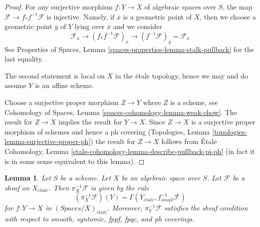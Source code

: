 \documentclass{stacks-project}
\theoremstyle{plain}
\newtheorem{lemma}[subsection]{Lemma}
\theoremstyle{definition}
\theoremstyle{remark}
\numberwithin{equation}{subsection}
\def\etale{{\acute{e}tale}}
\begin{document}
\begin{proof}
For any surjective morphism $f : Y \to X$ of algebraic spaces over $S$,
the map $\mathcal{F} \to f_*f^{-1}\mathcal{F}$ is injective.
Namely, if $\overline{x}$ is a geometric point of $X$, then we
choose a geometric point $\overline{y}$ of $Y$ lying over $\overline{x}$
and we consider
$$
\mathcal{F}_{\overline{x}} \to
(f_*f^{-1}\mathcal{F})_{\overline{x}} \to
(f^{-1}\mathcal{F})_{\overline{y}} = \mathcal{F}_{\overline{x}}
$$
See Properties of Spaces, Lemma \ref{spaces-properties-lemma-stalk-pullback}
for the last equality.

\medskip\noindent
The second statement is local on $X$ in the \'etale topology, hence we may
and do assume $Y$ is an affine scheme.

\medskip\noindent
Choose a surjective proper morphism $Z \to Y$ where $Z$ is a scheme, see
Cohomology of Spaces, Lemma \ref{spaces-cohomology-lemma-weak-chow}.
The result for $Z \to X$ implies the result for $Y \to X$.
Since $Z \to X$ is a surjective proper morphism of schemes
and hence a ph covering
(Topologies, Lemma \ref{topologies-lemma-surjective-proper-ph})
the result for $Z \to X$ follows from
\'Etale Cohomology, Lemma \ref{etale-cohomology-lemma-describe-pullback-pi-ph}
(in fact it is in some sense equivalent to this lemma).
\end{proof}

\begin{lemma}
\label{lemma-describe-pullback}
Let $S$ be a scheme. Let $X$ be an algebraic space over $S$.
Let $\mathcal{F}$ be a sheaf on $X_\etale$. Then
$\pi_X^{-1}\mathcal{F}$ is given by the rule
$$
(\pi_X^{-1}\mathcal{F})(Y) = \Gamma(Y_\etale, f_{small}^{-1}\mathcal{F})
$$
for $f : Y \to X$ in $(\textit{Spaces}/X)_\etale$.
Moreover, $\pi_Y^{-1}\mathcal{F}$ satisfies the
sheaf condition with respect to smooth, syntomic, fppf, fpqc, and ph coverings.
\end{lemma}
\end{document}
